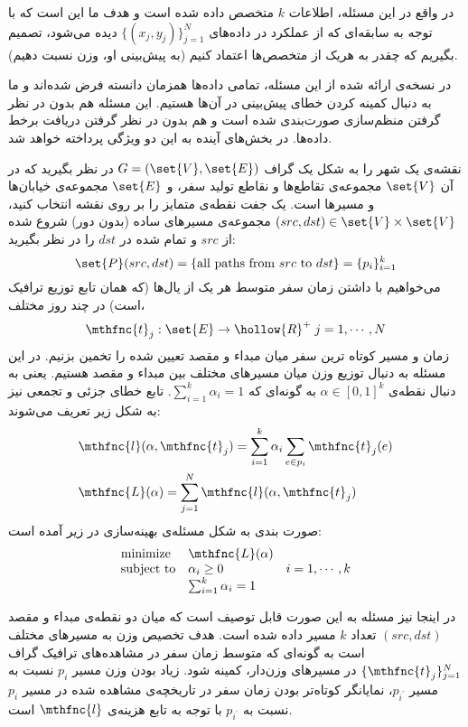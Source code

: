 در واقع در این مسئله، اطلاعات 
$k$ 
متخصص
داده شده است و هدف ما این است که با توجه به سابقه‌ای که از عملکرد در داده‌های 
$\{ (x_j, y_j) \}^{N}_{j=1}$ 
دیده می‌شود، تصمیم بگیریم که چقدر به هریک از متخصص‌ها اعتماد کنیم (به پیش‌بینی او، وزن نسبت دهیم).

در نسخه‌ی ارائه شده از این مسئله، تمامی داده‌ها همزمان دانسته فرض شده‌اند و ما به دنبال کمینه کردن خطای پیش‌بینی در آن‌ها هستیم. این مسئله هم بدون در نظر گرفتن منظم‌سازی
صورت‌بندی شده است و هم بدون در نظر گرفتن دریافت برخط
داده‌ها. در بخش‌های آینده به این دو ویژگی پرداخته خواهد شد.

نقشه‌ی یک شهر را به شکل یک گراف 
$G = (\set{V},\set{E})$ 
در نظر بگیرید که در آن 
$\set{V}$ 
مجموعه‌ی تقاطع‌ها و نقاطع تولید سفر، و 
$\set{E}$ 
مجموعه‌ی خیابان‌ها و مسیرها است. یک جفت نقطه‌ی متمایز را بر روی نقشه انتخاب کنید، 
$(src, dst) \in \set{V} \times \set{V}$ 
مجموعه‌ی مسیرهای ساده
(بدون دور) شروع شده از 
$src$ 
و تمام شده در 
$dst$ 
را در نظر بگیرید:
\[
\set{P}(src,dst) = \{ \mbox{all paths from } src \mbox{ to } dst \} = \{ p_i \}^{k}_{i=1}
\]
می‌خواهیم با داشتن زمان سفر متوسط هر یک از یال‌ها (که همان تابع توزیع ترافیک است) در چند روز مختلف،
\[
\mthfnc{t}_j : \set{E} \rightarrow \hollow{R}^+ \; j = 1,\cdots,N
\] 
زمان و مسیر کوتاه ترین سفر میان مبداء و مقصد تعیین شده را تخمین بزنیم. در این مسئله به دنبال توزیع وزن میان مسیرهای مختلف بین مبداء و مقصد هستیم. یعنی به دنبال نقطه‌ی 
$\alpha \in [0,1]^k$ 
به گونه‌ای که 
$\sum^{k}_{i=1} \alpha_i = 1$. 
تابع خطای جزئی و تجمعی نیز به شکل زیر تعریف می‌شوند:
\[
\begin{split}
&\mthfnc{l}(\alpha, \mthfnc{t}_j) = \sum^{k}_{i=1} \alpha_i \sum_{e \in p_i} \mthfnc{t}_j(e)\\
&\mthfnc{L}(\alpha) = \sum^{N}_{j=1} \mthfnc{l}( \alpha, \mthfnc{t}_j )
\end{split}
\]
صورت بندی به شکل مسئله‌ی بهینه‌سازی در زیر آمده است:
\[
\begin{array}{lll}
\mbox{minimize} & \mthfnc{L}(\alpha) & \\
\mbox{subject to} & \alpha_i \geq 0 & i = 1,\cdots, k\\
& \sum^{k}_{i=1} \alpha_i = 1 & 
\end{array}
\]

در اینجا نیز مسئله به این صورت قابل توصیف است که میان دو نقطه‌ی مبداء و مقصد 
$(src, dst)$ 
تعداد 
$k$ 
مسیر داده شده است. هدف تخصیص وزن به مسیرهای مختلف است به گونه‌ای که متوسط زمان سفر در مشاهده‌های ترافیک گراف 
$\{ \mthfnc{t}_j \}^{N}_{j=1}$ 
در مسیرهای وزن‌دار، کمینه شود. زیاد بودن وزن مسیر 
$p_i$ 
نسبت به مسیر 
$p_{i^\prime}$، 
نمایانگر کوتاه‌تر بودن زمان سفر در تاریخچه‌ی مشاهده شده در مسیر 
$p_i$ 
نسبت به 
$p_{i^\prime}$ 
با توجه به تابع هزینه‌ی 
$\mthfnc{l}$ 
است.





